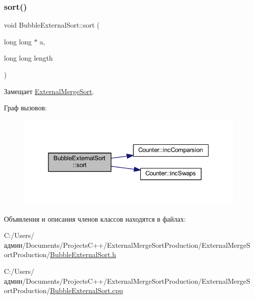 \subsubsection{\texorpdfstring{sort()}{sort()}}
{\footnotesize\ttfamily void Bubble\+External\+Sort\+::sort (\begin{DoxyParamCaption}\item[{long long $\ast$}]{a,  }\item[{long long}]{length }\end{DoxyParamCaption})\hspace{0.3cm}{\ttfamily [virtual]}}



Замещает \hyperlink{class_external_merge_sort_af6412221cc797a846243a343ccc12dba}{External\+Merge\+Sort}.

Граф вызовов\+:\nopagebreak
\begin{figure}[H]
\begin{center}
\leavevmode
\includegraphics[width=338pt]{class_bubble_external_sort_ac2c8c1a8dad0f0f99a176d3641b7625c_cgraph}
\end{center}
\end{figure}


Объявления и описания членов классов находятся в файлах\+:\begin{DoxyCompactItemize}
\item 
C\+:/\+Users/админ/\+Documents/\+Projects\+C++/\+External\+Merge\+Sort\+Production/\+External\+Merge\+Sort\+Production/\hyperlink{_bubble_external_sort_8h}{Bubble\+External\+Sort.\+h}\item 
C\+:/\+Users/админ/\+Documents/\+Projects\+C++/\+External\+Merge\+Sort\+Production/\+External\+Merge\+Sort\+Production/\hyperlink{_bubble_external_sort_8cpp}{Bubble\+External\+Sort.\+cpp}\end{DoxyCompactItemize}
